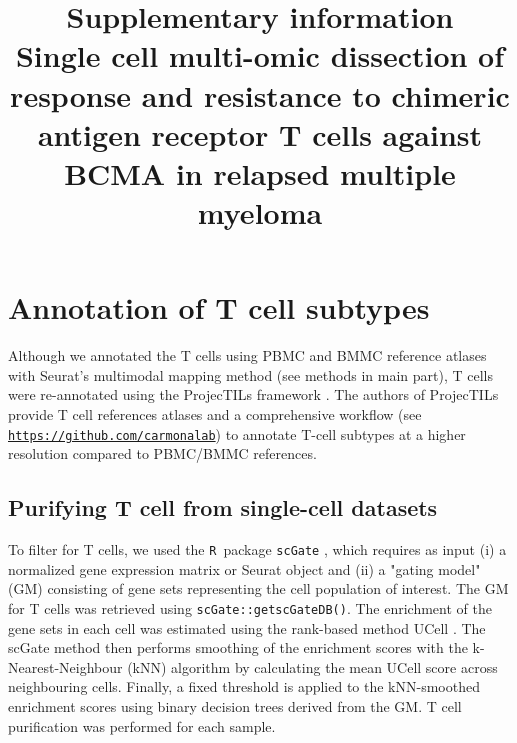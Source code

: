 \documentclass[10pt]{paper}
\title{\vspace{7cm}Supplementary information \\ \textnormal{Single cell multi-omic dissection of response and resistance to chimeric antigen receptor T cells against BCMA in relapsed multiple myeloma}}
\renewcommand\_{\textunderscore\allowbreak}
\newcommand{\R}{\texttt{R}}
\begin{document}
\maketitle

%

\thispagestyle{empty}

\clearpage




\section{Annotation of T cell subtypes}

Although we annotated the T cells using PBMC and BMMC reference atlases with Seurat's multimodal mapping method (see methods in main part), T cells were re-annotated using the ProjecTILs framework \cite{Andreatta2021-fw}. The authors of ProjecTILs provide T cell references atlases and a comprehensive workflow (see \href{https://github.com/carmonalab}{\nolinkurl{https://github.com/carmonalab}}) to annotate T-cell subtypes at a higher resolution compared to PBMC/BMMC references.

\subsection{Purifying T cell from single-cell datasets} \label{cell_filer_2}

To filter for T cells, we used the \R\ package \texttt{scGate} \cite{Andreatta2022-al}, which requires as input (i) a normalized gene expression matrix or Seurat object and (ii) a "gating model" (GM) consisting of gene sets representing the cell population of interest. The GM for T cells was retrieved using \texttt{scGate::get\_scGateDB()}. The enrichment of the gene sets in each cell was estimated using the rank-based method UCell \cite{Andreatta2021-yh}. The scGate method then performs smoothing of the enrichment scores with the k-Nearest-Neighbour (kNN) algorithm by calculating the mean UCell score across neighbouring cells. Finally, a fixed threshold is applied to the kNN-smoothed enrichment scores using binary decision trees derived from the GM. T cell purification was performed for each sample.
\end{document}
